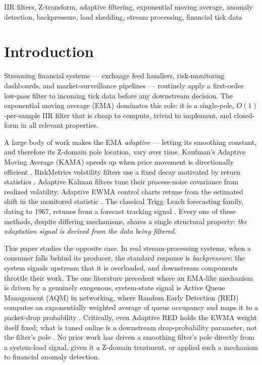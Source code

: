 \documentclass[conference]{IEEEtran}
\begin{document}
\begin{IEEEkeywords}
IIR filters, Z-transform, adaptive filtering, exponential moving average,
anomaly detection, backpressure, load shedding, stream processing,
financial tick data
\end{IEEEkeywords}

\section{Introduction}

Streaming financial systems — exchange feed handlers, risk-monitoring
dashboards, and market-surveillance pipelines — routinely apply a
first-order low-pass filter to incoming tick data before any downstream
decision. The exponential moving average (EMA) dominates this role: it is
a single-pole, $O(1)$-per-sample IIR filter that is cheap to compute, trivial
to implement, and closed-form in all relevant properties.

A large body of work makes the EMA \emph{adaptive} — letting its smoothing
constant, and therefore its Z-domain pole location, vary over time. Kaufman's
Adaptive Moving Average (KAMA) speeds up when price movement is directionally
efficient \cite{kama}. RiskMetrics volatility filters use a fixed decay
motivated by return statistics \cite{riskmetrics}. Adaptive Kalman filters
tune their process-noise covariance from realized volatility. Adaptive EWMA
control charts retune from the estimated shift in the monitored statistic
\cite{aewma1, aewma2}. The classical Trigg--Leach forecasting family, dating
to 1967, retunes from a forecast tracking signal \cite{triggleach}. Every
one of these methods, despite differing mechanisms, shares a single structural
property: \emph{the adaptation signal is derived from the data being filtered}.

This paper studies the opposite case. In real stream-processing systems,
when a consumer falls behind its producer, the standard response is
\emph{backpressure}: the system signals upstream that it is overloaded, and
downstream components throttle their work. The one literature precedent where
an EMA-like mechanism is driven by a genuinely exogenous, system-state signal
is Active Queue Management (AQM) in networking, where Random Early Detection
(RED) computes an exponentially weighted average of queue occupancy and maps
it to a packet-drop probability \cite{red}. Critically, even Adaptive RED
holds the EWMA weight itself fixed; what is tuned online is a downstream
drop-probability parameter, not the filter's pole \cite{ared}. No prior work
has driven a smoothing filter's pole directly from a system-load signal,
given it a Z-domain treatment, or applied such a mechanism to financial
anomaly detection.
\end{document}
